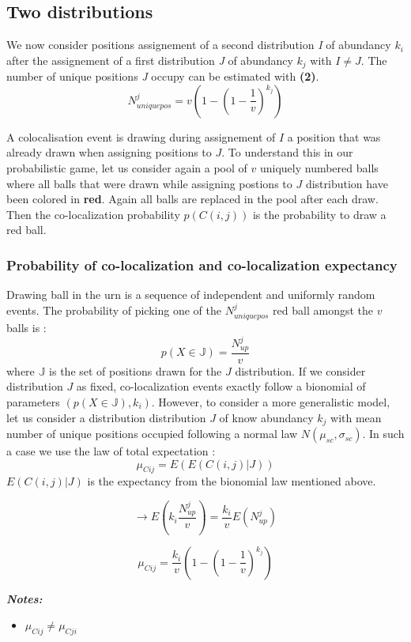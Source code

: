 \documentclass{article}
\begin{document}
\newpage
\subsection{Two distributions}
We now consider positions assignement of a second distribution \textit{I} of abundancy $ k_i $ after the assignement of a first 
distribution \textit{J} of abundancy $ k_j $ with $ I \neq J $. The number of unique positions \textit{J} occupy can be estimated with
\textbf{(2)}.
\[
N^j_{uniquepos} = v(1-(1-\frac{1}{v})^{k_j})
\]

A colocalisation event is drawing during assignement of $I$ a position that was already drawn when assigning positions to $J$. To
understand this in our probabilistic game, let us consider again a pool of $v$ uniquely numbered balls where all balls that were 
drawn while assigning postions to $J$ distribution have been colored in \textbf{red}. Again all balls are replaced in the pool after
each draw. Then the co-localization probability $p(C(i,j))$ is the
probability to draw a red ball.

\subsubsection{Probability of co-localization and co-localization expectancy}
Drawing ball in the urn is a sequence of independent and uniformly random events. The probability of picking one of the $N^j_{uniquepos}$ red ball amongst the $v$
balls is :
\[
p(X\in \mathbb{J}) = \frac{N^j_{up}}{v}
\] 
where $\mathbb{J}$  is the set of positions drawn for the $J$ distribution.
If we consider distribution $J$ as fixed, co-localization events exactly follow a bionomial of parameters $(p(X\in\mathbb{J}),k_i)$. However, to consider a
more generalistic model, let us consider a distribution distribution $J$ of know abundancy $k_j$ with mean number of unique positions occupied following a
normal law $N(\mu_{sc}, \sigma_{sc})$. In such a case we use the law of total expectation :
\[
\mu_{Cij} = E(E(C(i,j) | J))
\]
$E(C(i,j) | J)$ is the expectancy from the bionomial law mentioned above.

\[
\rightarrow E(k_i\frac{N^j_{up}}{v}) = \frac{k_i}{v}E(N^j_{up})
\]

\begin{equation}
    \mu_{Cij} = \frac{k_i}{v}(1-(1-\frac{1}{v})^{k_j})
\end{equation}

\textit{\textbf{Notes:}}
\begin{itemize}
    \item $\mu_{Cij} \neq \mu_{Cji}$
\end{itemize}
\end{document}
